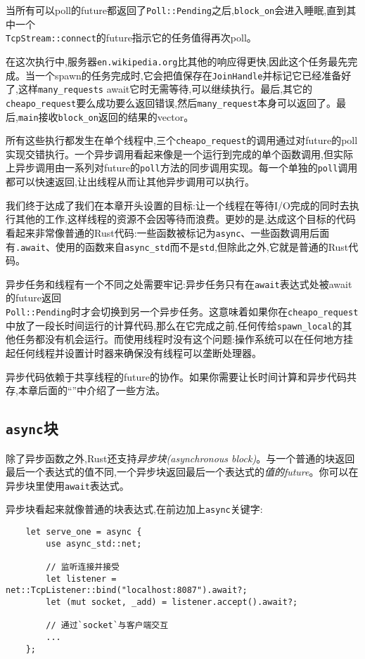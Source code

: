 当所有可以poll的future都返回了\texttt{Poll::Pending}之后,\texttt{block\_on}会进入睡眠,直到其中一个\\
\texttt{TcpStream::connect}的future指示它的任务值得再次poll。

在这次执行中,服务器\texttt{en.wikipedia.org}比其他的响应得更快,因此这个任务最先完成。当一个spawn的任务完成时,它会把值保存在\texttt{JoinHandle}并标记它已经准备好了,这样\texttt{many\_requests} await它时无需等待,可以继续执行。最后,其它的\texttt{cheapo\_request}要么成功要么返回错误,然后\texttt{many\_request}本身可以返回了。最后,\texttt{main}接收\texttt{block\_on}返回的结果的vector。

所有这些执行都发生在单个线程中,三个\texttt{cheapo\_request}的调用通过对future的poll实现交错执行。一个异步调用看起来像是一个运行到完成的单个函数调用,但实际上异步调用由一系列对future的\texttt{poll}方法的同步调用实现。每一个单独的\texttt{poll}调用都可以快速返回,让出线程从而让其他异步调用可以执行。

我们终于达成了我们在本章开头设置的目标:让一个线程在等待I/O完成的同时去执行其他的工作,这样线程的资源不会因等待而浪费。更妙的是,达成这个目标的代码看起来非常像普通的Rust代码:一些函数被标记为\texttt{async}、一些函数调用后面有\texttt{.await}、使用的函数来自\texttt{async\_std}而不是\texttt{std},但除此之外,它就是普通的Rust代码。

异步任务和线程有一个不同之处需要牢记:异步任务只有在\texttt{await}表达式处被await的future返回\\
\texttt{Poll::Pending}时才会切换到另一个异步任务。这意味着如果你在\texttt{cheapo\_request}中放了一段长时间运行的计算代码,那么在它完成之前,任何传给\texttt{spawn\_local}的其他任务都没有机会运行。而使用线程时没有这个问题:操作系统可以在任何地方挂起任何线程并设置计时器来确保没有线程可以垄断处理器。

异步代码依赖于共享线程的future的协作。如果你需要让长时间计算和异步代码共存,本章后面的“”中介绍了一些方法。

\subsection{\texttt{async}块}
除了异步函数之外,Rust还支持\emph{异步块(asynchronous block)}。与一个普通的块返回最后一个表达式的值不同,一个异步块返回最后一个表达式的\emph{值的future}。你可以在异步块里使用\texttt{await}表达式。

异步块看起来就像普通的块表达式,在前边加上\texttt{async}关键字:
\begin{verbatim}
    let serve_one = async {
        use async_std::net;

        // 监听连接并接受
        let listener = net::TcpListener::bind("localhost:8087").await?;
        let (mut socket, _add) = listener.accept().await?;

        // 通过`socket`与客户端交互
        ...
    };
\end{verbatim}

